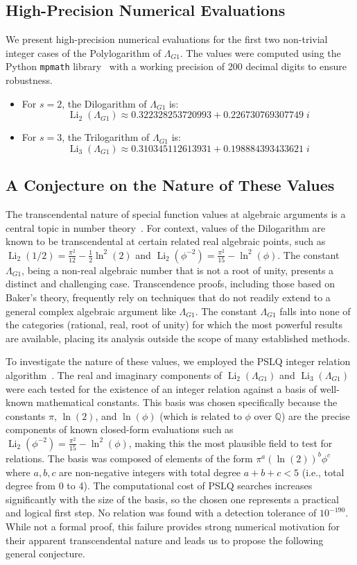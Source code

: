 \documentclass{amsart}
\theoremstyle{plain}
\theoremstyle{definition}
\theoremstyle{remark}
\DeclareMathOperator{\Li}{Li}
\newcommand{\LambdaG}{\Lambda_{G1}}
\newcommand{\phiG}{\phi}
\begin{document}
\subsection{High-Precision Numerical Evaluations}
We present high-precision numerical evaluations for the first two non-trivial integer cases of the Polylogarithm of $\LambdaG$. The values were computed using the Python \texttt{mpmath} library~\cite{mpmath} with a working precision of 200 decimal digits to ensure robustness.
\begin{itemize}
    \item For $s=2$, the Dilogarithm of $\LambdaG$ is:
    \[ \Li_2(\LambdaG) \approx 0.322328253720993 + 0.226730769307749\;i \]
    
    \item For $s=3$, the Trilogarithm of $\LambdaG$ is:
    \[ \Li_3(\LambdaG) \approx 0.310345112613931 + 0.198884393433621\;i \]
\end{itemize}

\subsection{A Conjecture on the Nature of These Values}
The transcendental nature of special function values at algebraic arguments is a central topic in number theory~\cite{Baker}. For context, values of the Dilogarithm are known to be transcendental at certain related real algebraic points, such as $\Li_2(1/2) = \frac{\pi^2}{12} - \frac{1}{2}\ln^2(2)$ and $\Li_2(\phiG^{-2}) = \frac{\pi^2}{15} - \ln^2(\phiG)$. The constant $\LambdaG$, being a non-real algebraic number that is not a root of unity, presents a distinct and challenging case. Transcendence proofs, including those based on Baker's theory, frequently rely on techniques that do not readily extend to a general complex algebraic argument like $\LambdaG$. The constant $\LambdaG$ falls into none of the categories (rational, real, root of unity) for which the most powerful results are available, placing its analysis outside the scope of many established methods.

To investigate the nature of these values, we employed the PSLQ integer relation algorithm~\cite{Bailey2007}. The real and imaginary components of $\Li_2(\LambdaG)$ and $\Li_3(\LambdaG)$ were each tested for the existence of an integer relation against a basis of well-known mathematical constants. This basis was chosen specifically because the constants $\pi$, $\ln(2)$, and $\ln(\phiG)$ (which is related to $\phiG$ over $\mathbb{Q}$) are the precise components of known closed-form evaluations such as $\Li_2(\phiG^{-2}) = \frac{\pi^2}{15} - \ln^2(\phiG)$, making this the most plausible field to test for relations. The basis was composed of elements of the form $\pi^a (\ln(2))^b \phiG^c$ where $a,b,c$ are non-negative integers with total degree $a+b+c < 5$ (i.e., total degree from 0 to 4). The computational cost of PSLQ searches increases significantly with the size of the basis, so the chosen one represents a practical and logical first step. No relation was found with a detection tolerance of $10^{-190}$. While not a formal proof, this failure provides strong numerical motivation for their apparent transcendental nature and leads us to propose the following general conjecture.
\end{document}
